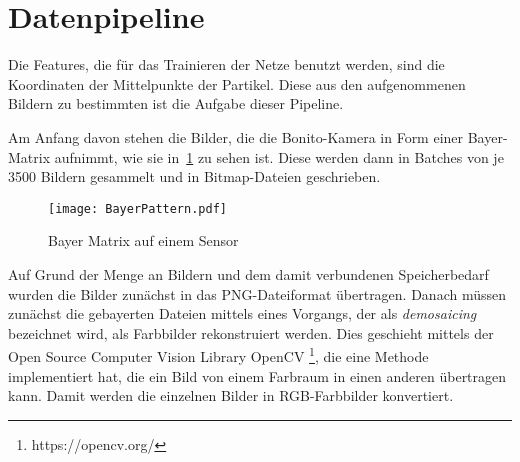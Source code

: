 \section{Datenpipeline} \label{sec:pipeline}


Die Features, die für das Trainieren der Netze benutzt werden, sind die Koordinaten der Mittelpunkte der Partikel.
Diese aus den aufgenommenen Bildern zu bestimmten ist die Aufgabe dieser Pipeline.

Am Anfang davon stehen die Bilder, die die Bonito-Kamera in Form einer Bayer-Matrix aufnimmt, wie sie in~\ref{fig:bayerPattern} zu sehen ist.
Diese werden dann in Batches von je 3500 Bildern gesammelt und in Bitmap-Dateien geschrieben.

\begin{figure}[h]
	\centering
	\texttt{[image: BayerPattern.pdf]}
	\caption{Bayer Matrix auf einem Sensor\cite{bayerPattern06}}
	\label{fig:bayerPattern}
\end{figure}

Auf Grund der Menge an Bildern und dem damit verbundenen Speicherbedarf wurden die Bilder zunächst in das PNG-Dateiformat übertragen.
Danach müssen zunächst die gebayerten Dateien mittels eines Vorgangs, der als \textit{demosaicing} bezeichnet wird,
als Farbbilder rekonstruiert werden.
Dies geschieht mittels der Open Source Computer Vision Library OpenCV \footnote{https://opencv.org/}, die eine Methode implementiert hat, die ein Bild von einem Farbraum in einen anderen übertragen kann.
Damit werden die einzelnen Bilder in RGB-Farbbilder konvertiert.





